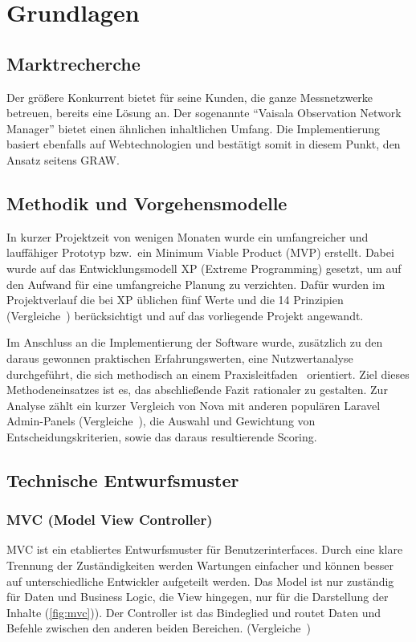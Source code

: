 \section{Grundlagen}

\subsection{Marktrecherche}
Der größere Konkurrent bietet für seine Kunden, die ganze Messnetzwerke betreuen, bereits eine Lösung an.
Der sogenannte \enquote{Vaisala Observation Network Manager}\cite{observation-network-manager} bietet einen ähnlichen inhaltlichen Umfang.
Die Implementierung basiert ebenfalls auf Webtechnologien und bestätigt somit in diesem Punkt, den Ansatz seitens GRAW.

\subsection{Methodik und Vorgehensmodelle}
In kurzer Projektzeit von wenigen Monaten wurde ein umfangreicher und lauffähiger Prototyp bzw.\ ein Minimum Viable Product (MVP) erstellt.
Dabei wurde auf das Entwicklungsmodell XP (Extreme Programming) gesetzt, um auf den Aufwand für eine umfangreiche Planung zu verzichten.
Dafür wurden im Projektverlauf die bei XP üblichen fünf Werte und die 14 Prinzipien (Vergleiche~\cite{agile-prozesse}) berücksichtigt und auf das vorliegende Projekt angewandt.

Im Anschluss an die Implementierung der Software wurde, zusätzlich zu den daraus gewonnen praktischen Erfahrungswerten, eine Nutzwertanalyse durchgeführt, die sich methodisch an einem Praxisleitfaden~\cite{scoring-und-nutzwertanalysen} orientiert.
Ziel dieses Methodeneinsatzes ist es, das abschließende Fazit rationaler zu gestalten.
Zur Analyse zählt ein kurzer Vergleich von Nova mit anderen populären Laravel Admin-Panels (Vergleiche~\cite{the-guide-to-laravel-admin-panels}), die Auswahl und Gewichtung von Entscheidungskriterien, sowie das daraus resultierende Scoring.

\subsection{Technische Entwurfsmuster}

\subsubsection{MVC (Model View Controller)}
MVC ist ein etabliertes Entwurfsmuster für Benutzerinterfaces.
Durch eine klare Trennung der Zuständigkeiten werden Wartungen einfacher und können besser auf unterschiedliche Entwickler aufgeteilt werden.
Das Model ist nur zuständig für Daten und Business Logic, die View hingegen, nur für die Darstellung der Inhalte (\ref{fig:mvc})).
Der Controller ist das Bindeglied und routet Daten und Befehle zwischen den anderen beiden Bereichen.
(Vergleiche~\cite{mdn-glossary-mvc})


